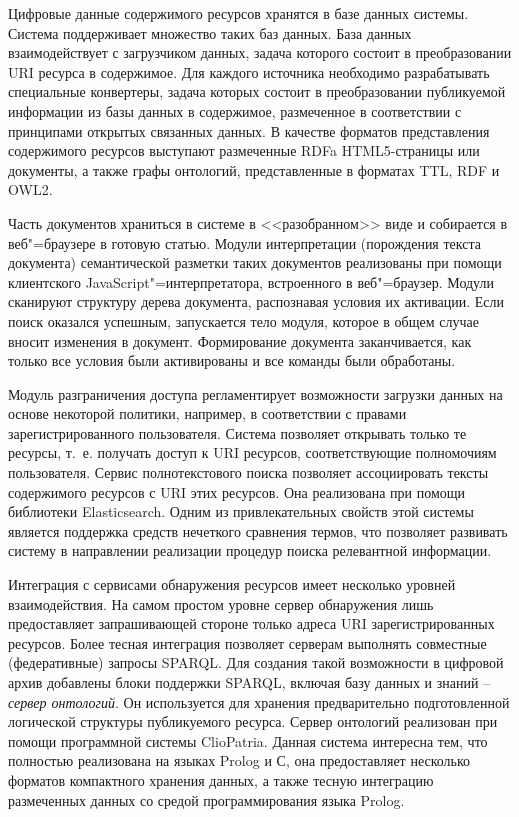 \documentclass[a4paper,12pt,openany,final]{extreport}
\begin{document}
Цифровые данные содержимого ресурсов хранятся в базе данных системы.  Система поддерживает множество таких баз данных. База данных взаимодействует с загрузчиком данных, задача которого состоит в преобразовании URI ресурса в содержимое. Для каждого источника необходимо разрабатывать специальные конвертеры, задача которых состоит в преобразовании публикуемой информации из базы данных в содержимое, размеченное в соответствии с принципами открытых связанных данных. В качестве форматов представления содержимого ресурсов выступают размеченные RDFa HTML5-страницы или документы, а также графы онтологий, представленные в форматах TTL, RDF и OWL2.

Часть документов храниться в системе в <<разобранном>> виде и собирается в веб"=браузере в готовую статью. Модули интерпретации (порождения текста документа) семантической разметки таких документов реализованы при помощи клиентского JavaScript"=интерпретатора, встроенного в веб"=браузер.  Модули сканируют структуру дерева документа, распознавая условия их активации. Если поиск оказался успешным, запускается тело модуля, которое в общем случае вносит изменения в документ. Формирование документа заканчивается, как только все условия были активированы и все команды были обработаны.

Модуль разграничения доступа регламентирует возможности загрузки данных на основе некоторой политики, например, в соответствии с правами зарегистрированного пользователя. Система позволяет открывать только те ресурсы, т.~е. получать доступ к URI ресурсов, соответствующие полномочиям пользователя. Сервис полнотекстового поиска позволяет ассоциировать тексты содержимого ресурсов с URI этих ресурсов. Она реализована при помощи библиотеки Elasticsearch. Одним из привлекательных свойств этой системы является поддержка средств нечеткого сравнения термов, что позволяет развивать систему в направлении реализации процедур поиска релевантной информации.

Интеграция с сервисами обнаружения ресурсов имеет несколько уровней взаимодействия. На самом простом уровне сервер обнаружения лишь предоставляет запрашивающей стороне только адреса URI зарегистрированных ресурсов. Более тесная интеграция позволяет серверам выполнять совместные (федеративные) запросы SPARQL. Для создания такой возможности в цифровой архив добавлены блоки поддержки SPARQL, включая базу данных и знаний -- \emph{сервер онтологий}. Он используется для хранения предварительно подготовленной логической структуры публикуемого ресурса.  Сервер онтологий реализован при помощи программной системы ClioPatria.  Данная система интересна тем, что полностью реализована на языках Prolog и С, она предоставляет несколько форматов компактного хранения данных, а также тесную интеграцию размеченных данных со средой программирования языка Prolog.
\end{document}

